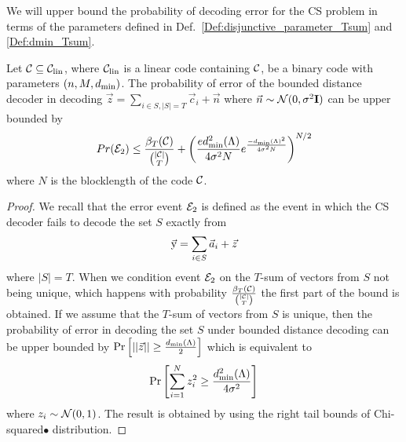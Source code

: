 We will upper bound the probability of decoding error for the CS problem in terms of the parameters defined in Def.~\ref{Def:disjunctive_parameter_Tsum} and \ref{Def:dmin_Tsum}.
\begin{lemma}
Let $\mathcal{C}\subseteq \mathcal{C}_{\text{lin}}$, where $\mathcal{C}_{\text{lin}}$ is a linear code containing $\mathcal{C}$, be a binary code with parameters $(n,M,d_{\mathrm{min}})$. The probability of error of the bounded distance decoder in decoding $\vec{z}=\sum_{i\in S,|S|= T}\vec{c}_i+\vec{n}$ where $\vec{n}\sim \mathcal{N}(0,\sigma^2 \mathbf{I})$ can be upper bounded by
\[
Pr(\mathcal{E}_2)\leq \frac{\beta_T(\mathcal{C})}{\binom{|\mathcal{C}|}{T}}+ \left(\frac{ed_{\mathrm{min}}^2(\Lambda)}{4\sigma^2 N}e^{\frac{-d_{\mathrm{min}}(\Lambda)^2}{4\sigma^2 N}}\right)^{N/2}
\]
where $N$ is the blocklength of the code $\mathcal{C}$.
\label{Lem:CS_UpperBound}
\end{lemma}
\begin{proof}
We recall that the error event $\mathcal{E}_2$ is defined as the event in which the CS decoder fails to decode the set $S$ exactly from
\[
\vec{\mathrm{y}}=\sum_{i\in S}\vec{a}_i+\vec{z}
\]
where $|S|=T$. When we condition event $\mathcal{E}_2$ on the $T$-sum of vectors from $S$ not being unique, which happens with probability $\frac{\beta_T(\mathcal{C})}{\binom{|\mathcal{C}|}{T}}$ the first part of the bound is obtained. If we assume that the $T$-sum of vectors from $S$ is unique, then the probability of error in decoding the set $S$ under bounded distance decoding can be upper bounded by  $\mathrm{Pr} \left[\left|\left|\vec{z}\right|\right|\geq \frac{d_{\mathrm{min}}(\Lambda)}{2}\right]$ which is equivalent to
\begin{align*}
 \mathrm{Pr}\left[ \sum_{i=1}^{N}z^2_i \geq \frac{d_{\mathrm{min}}^2(\Lambda)}{4\sigma^2}\right]
\end{align*}
where $z_i\sim \mathcal{N}(0,1)$. The result is obtained by using the right tail bounds of Chi-squared$•$ distribution.
\end{proof}

